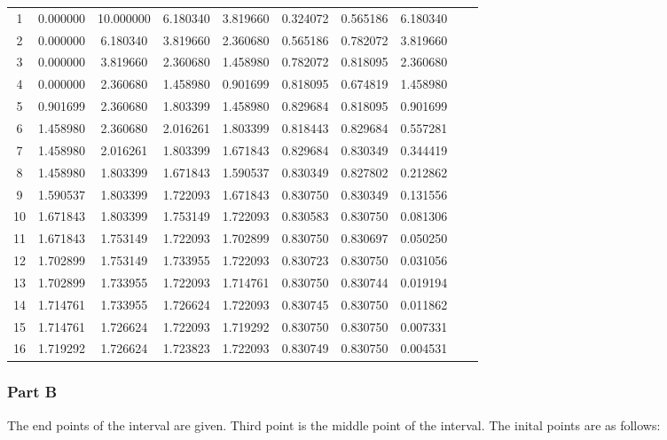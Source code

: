 \documentclass[12pt, a4paper]{article}
\numberwithin{equation}{section}
\begin{document}
\begin{longtable}{cccccccccc}
        1 &  0.000000 &  10.000000 &  6.180340 &  3.819660 &  0.324072 &  0.565186 &  6.180340 \\ 
        2 &  0.000000 &  6.180340 &  3.819660 &  2.360680 &  0.565186 &  0.782072 &  3.819660 \\ 
        3 &  0.000000 &  3.819660 &  2.360680 &  1.458980 &  0.782072 &  0.818095 &  2.360680 \\ 
        4 &  0.000000 &  2.360680 &  1.458980 &  0.901699 &  0.818095 &  0.674819 &  1.458980 \\ 
        5 &  0.901699 &  2.360680 &  1.803399 &  1.458980 &  0.829684 &  0.818095 &  0.901699 \\ 
        6 &  1.458980 &  2.360680 &  2.016261 &  1.803399 &  0.818443 &  0.829684 &  0.557281 \\ 
        7 &  1.458980 &  2.016261 &  1.803399 &  1.671843 &  0.829684 &  0.830349 &  0.344419 \\ 
        8 &  1.458980 &  1.803399 &  1.671843 &  1.590537 &  0.830349 &  0.827802 &  0.212862 \\ 
        9 &  1.590537 &  1.803399 &  1.722093 &  1.671843 &  0.830750 &  0.830349 &  0.131556 \\ 
        10 &  1.671843 &  1.803399 &  1.753149 &  1.722093 &  0.830583 &  0.830750 &  0.081306 \\ 
        11 &  1.671843 &  1.753149 &  1.722093 &  1.702899 &  0.830750 &  0.830697 &  0.050250 \\ 
        12 &  1.702899 &  1.753149 &  1.733955 &  1.722093 &  0.830723 &  0.830750 &  0.031056 \\ 
        13 &  1.702899 &  1.733955 &  1.722093 &  1.714761 &  0.830750 &  0.830744 &  0.019194 \\ 
        14 &  1.714761 &  1.733955 &  1.726624 &  1.722093 &  0.830745 &  0.830750 &  0.011862 \\ 
        15 &  1.714761 &  1.726624 &  1.722093 &  1.719292 &  0.830750 &  0.830750 &  0.007331 \\ 
        16 &  1.719292	& 1.726624	& 1.723823	& 1.722093	& 0.830749	& 0.830750	& 0.004531	\\ 

\end{longtable}


\subsubsection{Part B}
The end points of the interval are given. Third point is the middle point of the interval. The inital points are as follows:
\end{document}
